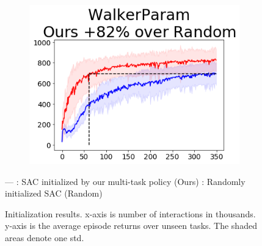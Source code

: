 \begin{figure}[t]
{        \begin{subfigure}{0.15\paperwidth}
            \includegraphics[width=\linewidth]{chapter_2/fig/init-sac-vs-train-WalkerParam.png}
        \end{subfigure}}
    \small{\color{red}--- }: SAC initialized by our multi-task policy (Ours) \qquad  {\color{blue}--- }: Randomly initialized SAC (Random)
    \caption{Initialization results.
        x-axis is number of interactions in thousands.
        y-axis is the average episode returns over unseen tasks.
        The shaded areas denote one std. }
    \label{fig:SAC_init}
\end{figure}
